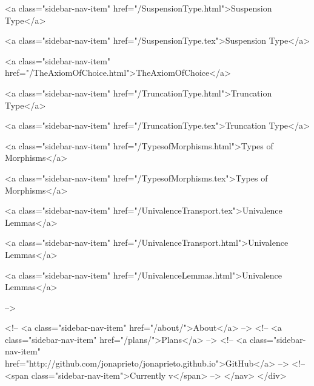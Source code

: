       
    
      
        
          <a class="sidebar-nav-item" href="/SuspensionType.html">Suspension Type</a>
        
      
    
      
        
          <a class="sidebar-nav-item" href="/SuspensionType.tex">Suspension Type</a>
        
      
    
      
        
          <a class="sidebar-nav-item" href="/TheAxiomOfChoice.html">TheAxiomOfChoice</a>
        
      
    
      
        
          <a class="sidebar-nav-item" href="/TruncationType.html">Truncation Type</a>
        
      
    
      
        
          <a class="sidebar-nav-item" href="/TruncationType.tex">Truncation Type</a>
        
      
    
      
        
          <a class="sidebar-nav-item" href="/TypesofMorphisms.html">Types of Morphisms</a>
        
      
    
      
        
          <a class="sidebar-nav-item" href="/TypesofMorphisms.tex">Types of Morphisms</a>
        
      
    
      
        
          <a class="sidebar-nav-item" href="/UnivalenceTransport.tex">Univalence Lemmas</a>
        
      
    
      
        
          <a class="sidebar-nav-item" href="/UnivalenceTransport.html">Univalence Lemmas</a>
        
      
    
      
        
          <a class="sidebar-nav-item" href="/UnivalenceLemmas.html">Univalence Lemmas</a>
        
      
     -->

    <!-- <a class="sidebar-nav-item" href="/about/">About</a> -->
    <!-- <a class="sidebar-nav-item" href="/plans/">Plans</a> -->
    <!-- <a class="sidebar-nav-item" href="http://github.com/jonaprieto/jonaprieto.github.io">GitHub</a> -->
    <!-- <span class="sidebar-nav-item">Currently v</span> -->
  </nav>
</div>

